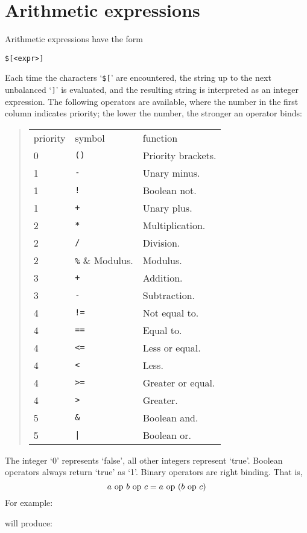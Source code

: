 \section{Arithmetic expressions}
\label{s.intexpr}
Arithmetic expressions have the form
\begin{showfile}
\begin{verbatim}
$[<expr>]
\end{verbatim}
\end{showfile}
Each time the characters `{\tt \$[}' are encountered,
the string up to the next unbalanced `{\tt ]}' is evaluated,
and the resulting string is
interpreted as an integer expression.
The following operators are available, where the number in the first column
indicates priority; the lower the number, the stronger an operator binds:
\begin{quote}
\begin{tabular}{lll}
priority & symbol & function \\
0 & \verb'()' & Priority brackets. \\
1 & \verb'-' & Unary minus. \\
1 & \verb'!' & Boolean not. \\
1 & \verb'+' & Unary plus. \\
2 & \verb'*' & Multiplication. \\
2 & \verb'/' & Division. \\
2 & \verb'%' & Modulus. \\
3 & \verb'+' & Addition. \\
3 & \verb'-' & Subtraction.\\
4 & \verb'!=' & Not equal to. \\
4 & \verb'==' & Equal to. \\
4 & \verb'<=' & Less or equal. \\
4 & \verb'<' & Less. \\
4 & \verb'>=' & Greater or equal. \\
4 & \verb'>' & Greater. \\
5 & \verb'&' & Boolean and. \\
5 & \verb'|' & Boolean or. \\
\end{tabular}
\end{quote}
The integer `0' represents `false',
all other integers represent `true'.
Boolean operators always return `true' as `1'.
Binary operators are right binding.
That is,
\[ a\ {\rm op}\ b\ {\rm op}\ c = a\ {\rm op}\ (b\ {\rm op}\ c) \]
For example:
\begin{showfile}

\end{showfile}
will produce:
\begin{showfile}

\end{showfile}
